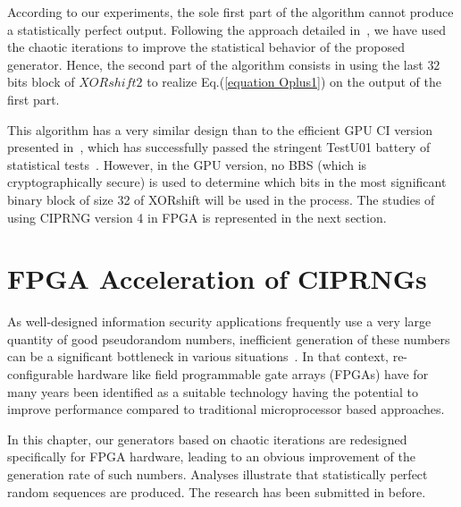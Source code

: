 According to our experiments, the sole first part of the algorithm cannot 
produce a statistically perfect output. 
Following the approach detailed in~\cite{bfg12a:ip}, 
we have used the chaotic iterations to improve the 
statistical behavior of the proposed generator.
Hence, the second part of the algorithm consists 
in using the last $32$ bits block of $XORshift2$ 
to realize Eq.(\ref{equation Oplus1}) on the output 
of the first part. 

This algorithm has a very similar design than to the efficient GPU CI version
presented in~\cite{DBLP:journals/corr/abs-1112-5239}, which has 
successfully passed the stringent TestU01 battery of statistical 
tests~\cite{Lecuyer2009}.
However, in the GPU version, no BBS (which is cryptographically secure) is used to determine which bits
in the most significant binary block of size 32 of XORshift
will be used in the process. The studies of using CIPRNG version 4 in FPGA is represented in the next section.


\section{FPGA Acceleration of CIPRNGs}
\label{FPGA Acceleration of CIPRNGs}

As well-designed information security 
applications frequently use a very large quantity of good 
pseudorandom numbers, inefficient generation of 
these numbers can be a significant bottleneck 
in various situations~\cite{Porter198443,Batina20031,Carroll1990613,Liu2012331}. 
In that context, re-configurable hardware like field programmable gate arrays (FPGAs)
 have for many years been identified as a suitable technology having the potential to improve performance compared to traditional microprocessor based approaches. 

In this chapter, %
our generators based on chaotic 
iterations are redesigned specifically for FPGA hardware, 
leading to an obvious improvement of the 
generation rate of such numbers. Analyses illustrate that 
statistically perfect random sequences 
are produced.
The research has been submitted in \cite{submit1, submit3} before.

